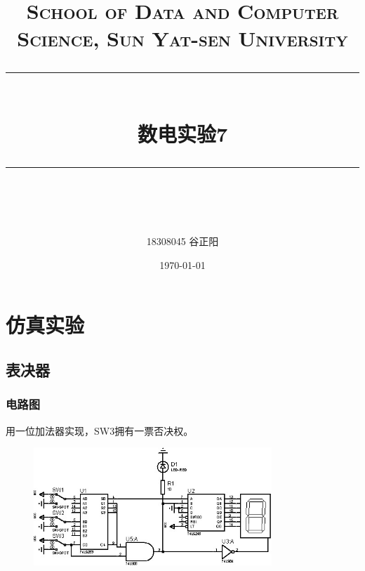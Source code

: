 \documentclass[UTF8, a4paper, 11pt]{article}
\title{	
\normalfont \normalsize
\textsc{School of Data and Computer Science, Sun Yat-sen University} \\ [25pt] %
\rule{\textwidth}{0.5pt} \\[0.4cm] %
\huge 数电实验7\\ %
\rule{\textwidth}{2pt} \\[0.5cm] %
\author{18308045 谷正阳}
\date{\normalsize\today}
}
\begin{document}
\maketitle
\tableofcontents
\newpage
\section{仿真实验}
\subsection{表决器}
\subsubsection{电路图}
用一位加法器实现，SW3拥有一票否决权。
\begin{figure}[H]
    \centering
    \includegraphics[width=0.8\textwidth]{ex7.1电路图.jpg}
\end{figure}
\end{document}
